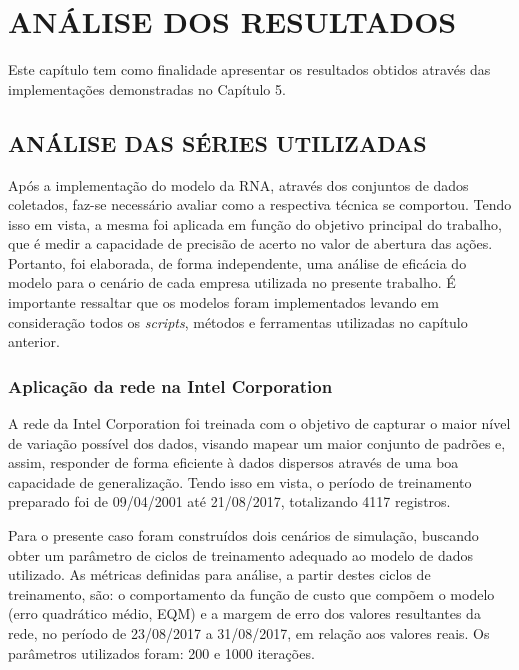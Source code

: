 
\chapter{ANÁLISE DOS RESULTADOS}\label{ch:resultados}
Este capítulo tem como finalidade apresentar os resultados obtidos através das implementações demonstradas no Capítulo 5.

\section{ANÁLISE DAS SÉRIES UTILIZADAS}
Após a implementação do modelo da RNA, através dos conjuntos de dados coletados, faz-se necessário avaliar como a respectiva técnica se comportou. Tendo isso em vista, a mesma foi aplicada em função do objetivo principal do trabalho, que é medir a capacidade de precisão de acerto no valor de abertura das ações. Portanto, foi elaborada, de forma independente, uma análise de eficácia do modelo para o cenário de cada empresa utilizada no presente trabalho. É importante ressaltar que os modelos foram implementados levando em consideração todos os \textit{scripts}, métodos e ferramentas utilizadas no capítulo anterior.

\subsection{Aplicação da rede na Intel Corporation}
A rede da Intel Corporation foi treinada com o objetivo de capturar o maior nível de variação possível dos dados, visando mapear um maior conjunto de padrões e, assim, responder de forma eficiente à dados dispersos através de uma boa capacidade de generalização. Tendo isso em vista, o período de treinamento preparado foi de 09/04/2001 até 21/08/2017, totalizando 4117 registros.

Para o presente caso foram construídos dois cenários de simulação, buscando obter um parâmetro de ciclos de treinamento adequado ao modelo de dados utilizado. As métricas definidas para análise, a partir destes ciclos de treinamento, são: o comportamento da função de custo que compõem o modelo (erro quadrático médio, EQM) e a margem de erro dos valores resultantes da rede, no período de 23/08/2017 a 31/08/2017, em relação aos valores reais. Os parâmetros utilizados foram: 200 e 1000 iterações.

